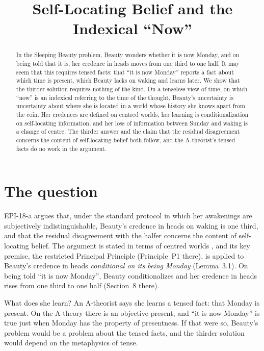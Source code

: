 \documentclass{situationist-preprint}
\title{Self-Locating Belief and the Indexical \enquote{Now}}
\begin{document}
\maketitle

\begin{abstract}
In the Sleeping Beauty problem, Beauty wonders whether it is now Monday, and on being told that it is, her credence in heads moves from one third to one half. It may seem that this requires tensed facts: that \enquote{it is now Monday} reports a fact about which time is present, which Beauty lacks on waking and learns later. We show that the thirder solution requires nothing of the kind. On a tenseless view of time, on which \enquote{now} is an indexical referring to the time of the thought, Beauty's uncertainty is uncertainty about where she is located in a world whose history she knows apart from the coin. Her credences are defined on centred worlds, her learning is conditionalization on self-locating information, and her loss of information between Sunday and waking is a change of centre. The thirder answer and the claim that the residual disagreement concerns the content of self-locating belief both follow, and the A-theorist's tensed facts do no work in the argument.
\end{abstract}

\section{The question}

EPI-18-a argues that, under the standard protocol in which her awakenings are subjectively indistinguishable, Beauty's credence in heads on waking is one third, and that the residual disagreement with the halfer concerns the content of self-locating belief. The argument is stated in terms of centred worlds \citep{Lewis1979}, and its key premise, the restricted Principal Principle (Principle~P1 there), is applied to Beauty's credence in heads \emph{conditional on its being Monday} (Lemma~3.1). On being told \enquote{it is now Monday}, Beauty conditionalizes and her credence in heads rises from one third to one half (Section~8 there).

What does she learn? An A-theorist says she learns a tensed fact: that Monday is present. On the A-theory there is an objective present, and \enquote{it is now Monday} is true just when Monday has the property of presentness. If that were so, Beauty's problem would be a problem about the tensed facts, and the thirder solution would depend on the metaphysics of tense.
\end{document}
